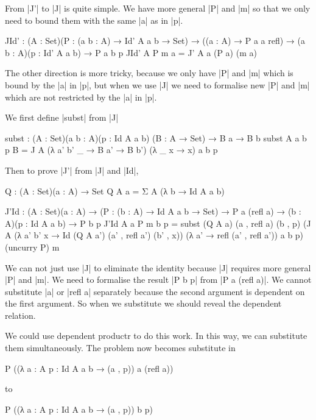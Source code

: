 From |J'| to |J| is quite simple. We have more general |P| and |m| so
that we only need to bound them with the same |a| as in |p|.

\begin{code}
JId' : (A : Set)(P : (a b : A) → Id' A a b → Set)
    → ((a : A) → P a a refl)
    → (a b : A)(p : Id' A a b) → P a b p
JId' A P m a = J' A a (P a) (m a)
\end{code}


The other direction is more tricky, because we only have |P| and |m|
which is bound by the |a| in |p|, but when we use |J| we need to
formalise new |P| and |m| which are not restricted by the |a| in |p|.

We first define |subst| from |J|

\begin{code}

subst : (A : Set)(a b : A)(p : Id A a b)
        (B : A → Set) → B a → B b
subst A a b p B = J A (λ a' b' _ → B a' → B b') (λ _ x → x) a b p
\end{code}

Then to prove |J'| from |J| and |Id|,
\begin{code}

Q : (A : Set)(a : A) → Set
Q A a = Σ A (λ b → Id A a b)

J'Id : (A : Set)(a : A) → (P : (b : A) → Id A a b → Set)
  → P a (refl a)
  → (b : A)(p : Id A a b) → P b p
J'Id A a P m b p = subst (Q A a) (a , refl a) (b , p)
  (J A (λ a' b' x → Id (Q A a') (a' , refl a') (b' , x))
  (λ a' → refl (a' , refl a')) a b p) (uncurry P) m
\end{code}
We can not just use |J| to eliminate the identity because |J| requires
more general |P| and |m|.
We need to formalise the result |P b p| from |P a (refl a)|. We cannot
substitute |a| or |refl a| separately because the second argument is
dependent on the first argument. So when we substitute we should reveal
the dependent relation. 

We could use dependent productr to do this work. In this way, we can
substitute them simultaneously. The problem now becomes substitute in
\begin{code} P ((λ a : A p : Id A a b → (a , p)) a (refl a)) \end{code} to \begin{code} P ((λ a : A p : Id A a b → (a , p)) b p) \end{code}

